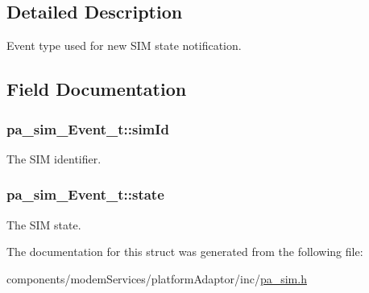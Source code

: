\subsection{Detailed Description}
Event type used for new S\+IM state notification. 

\subsection{Field Documentation}
\subsubsection[{\texorpdfstring{sim\+Id}{simId}}]{ pa\+\_\+sim\+\_\+\+Event\+\_\+t\+::sim\+Id}\hypertarget{structpa__sim___event__t_a07e399c7effb335b881f3c72d83f897b}{}\label{structpa__sim___event__t_a07e399c7effb335b881f3c72d83f897b}


The S\+IM identifier. 

\subsubsection[{\texorpdfstring{state}{state}}]{ pa\+\_\+sim\+\_\+\+Event\+\_\+t\+::state}\hypertarget{structpa__sim___event__t_a636ebff9013587a10afcb348b417536c}{}\label{structpa__sim___event__t_a636ebff9013587a10afcb348b417536c}


The S\+IM state. 



The documentation for this struct was generated from the following file\+:\begin{DoxyCompactItemize}
\item 
components/modem\+Services/platform\+Adaptor/inc/\hyperlink{pa__sim_8h}{pa\+\_\+sim.\+h}\end{DoxyCompactItemize}
